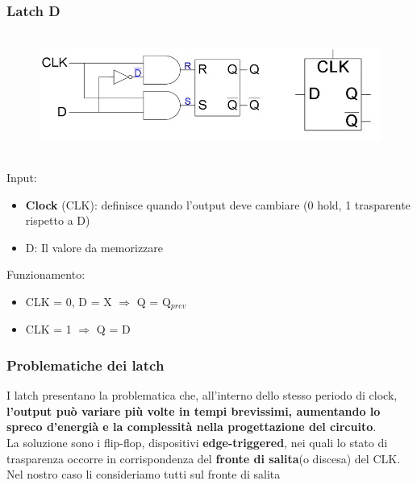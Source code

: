 \documentclass{report}
\begin{document}
        \subsubsection{Latch D}
            \begin{center}
                \begin{figure}[H]
                    \includegraphics[width=\textwidth, height=4cm]{latchd.png}
                \end{figure}
            \end{center}
            Input:
            \begin{itemize}
                \item \textbf{Clock} (CLK): definisce quando l'output deve cambiare (0 hold, 1 trasparente rispetto a D)
                \item D: Il valore da memorizzare
            \end{itemize}
            Funzionamento:
            \begin{itemize}
                \item CLK = 0, D = X $\Longrightarrow$ Q = Q$_{prev}$
                \item CLK = 1 $\Longrightarrow$ Q = D
            \end{itemize}
        \subsubsection{Problematiche dei latch}
            I latch presentano la problematica che, all'interno dello stesso periodo
            di clock, \textbf{l'output può variare più volte in tempi brevissimi, aumentando lo 
            spreco d'energià e la complessità nella progettazione del circuito}. \\
            La soluzione sono i flip-flop, dispositivi \textbf{edge-triggered}, nei quali lo stato di trasparenza occorre 
            in corrispondenza del \textbf{fronte di salita}(o discesa) del CLK. \\
            Nel nostro caso li consideriamo tutti sul fronte di salita
\end{document}

